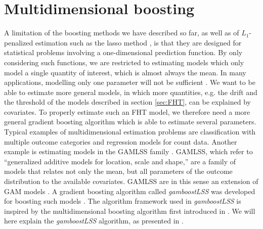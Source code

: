\section{Multidimensional boosting}
A limitation of the boosting methods we have described so far, as well as of $L_1$-penalized estimation such as the lasso method \citep{lasso}, is that they are designed for statistical problems involving a one-dimensional prediction function.
By only considering such functions, we are restricted to estimating models which only model a single quantity of interest, which is almost always the mean.
In many applications, modelling only one parameter will not be sufficient \citep{kneib2013}.
We want to be able to estimate more general models, in which more quantities, e.g. the drift and the threshold of the models described in section \ref{sec:FHT}, can be explained by covariates.
To properly estimate such an FHT model, we therefore need a more general gradient boosting algorithm which is able to estimate several parameters.
Typical examples of multidimensional estimation problems are classification with multiple outcome categories and regression models for count data.
Another example is estimating models in the GAMLSS family \citep{gamlss}.
GAMLSS, which refer to ``generalized additive models for location, scale and shape,'' are a family of models that relates not only the mean, but all parameters of the outcome distribution to the available covariates.
GAMLSS are in this sense an extension of GAM models \citep{gam-book}.
A gradient boosting algorithm called \textit{gamboostLSS} was developed for boosting such models \citep{gamboostlss-paper}.
The algorithm framework used in \textit{gamboostLSS} is inspired by the multidimensional boosting algorithm first introduced in \citet{schmid}.
We will here explain the \textit{gamboostLSS} algorithm, as presented in \citet{gamboostlss-paper}.

